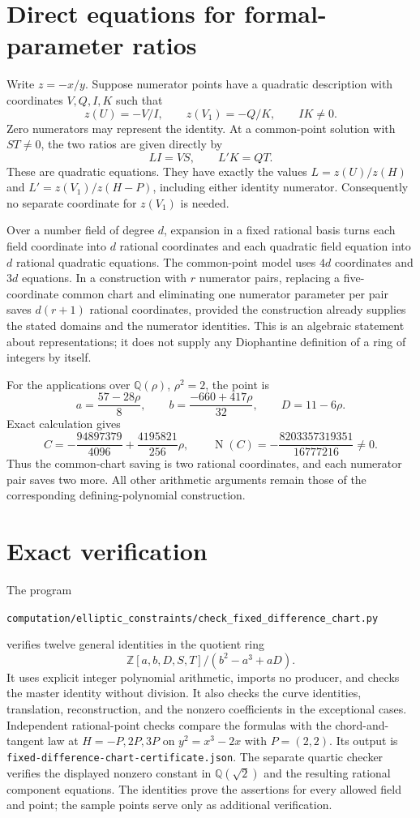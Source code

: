 \documentclass[11pt,a4paper]{article}
\newcommand{\Q}{\mathbb Q}
\DeclareMathOperator{\Nm}{N}
\begin{document}
\section{Direct equations for formal-parameter ratios}
Write $z=-x/y$. Suppose numerator points have a quadratic description
with coordinates $V,Q,I,K$ such that
\[
 z(U)=-V/I,\qquad z(V_1)=-Q/K,\qquad IK\ne0.
\]
Zero numerators may represent the identity. At a common-point solution
with $ST\ne0$, the two ratios are given directly by
\[
 LI=VS,\qquad L'K=QT.
\]
These are quadratic equations. They have exactly the values
$L=z(U)/z(H)$ and $L'=z(V_1)/z(H-P)$, including either identity
numerator. Consequently no separate coordinate for $z(V_1)$ is needed.

Over a number field of degree $d$, expansion in a fixed rational basis
turns each field coordinate into $d$ rational coordinates and each
quadratic field equation into $d$ rational quadratic equations.
The common-point model uses $4d$ coordinates and $3d$ equations.
In a construction with $r$ numerator pairs, replacing a five-coordinate
common chart and eliminating one numerator parameter per pair saves
$d(r+1)$ rational coordinates, provided the construction already
supplies the stated domains and the numerator identities.
This is an algebraic statement about representations; it does not
supply any Diophantine definition of a ring of integers by itself.

For the applications over $\Q(\rho)$, $\rho^2=2$, the point is
\[
 a=\frac{57-28\rho}{8},\qquad b=\frac{-660+417\rho}{32},
 \qquad D=11-6\rho.
\]
Exact calculation gives
\[
 C=-\frac{94897379}{4096}+\frac{4195821}{256}\rho,
 \qquad \Nm(C)=-\frac{8203357319351}{16777216}\ne0.
\]
Thus the common-chart saving is two rational coordinates, and each
numerator pair saves two more. All other arithmetic arguments remain
those of the corresponding defining-polynomial construction.

\section{Exact verification}
The program
\begin{center}\small
\nolinkurl{computation/elliptic_constraints/check_fixed_difference_chart.py}
\end{center}
verifies twelve general identities in the quotient ring
\[
 \mathbb Z[a,b,D,S,T]/(b^2-a^3+aD).
\]
It uses explicit integer polynomial arithmetic, imports no producer,
and checks the master identity without division. It also checks the
curve identities, translation, reconstruction, and the nonzero
coefficients in the exceptional cases. Independent rational-point
checks compare the formulas with the chord-and-tangent law at
$H=-P,2P,3P$ on $y^2=x^3-2x$ with $P=(2,2)$.
Its output is
\nolinkurl{fixed-difference-chart-certificate.json}.
The separate quartic checker verifies the displayed nonzero constant
in $\Q(\sqrt2)$ and the resulting rational component equations.
The identities prove the assertions for every allowed field and point;
the sample points serve only as additional verification.
\end{document}
